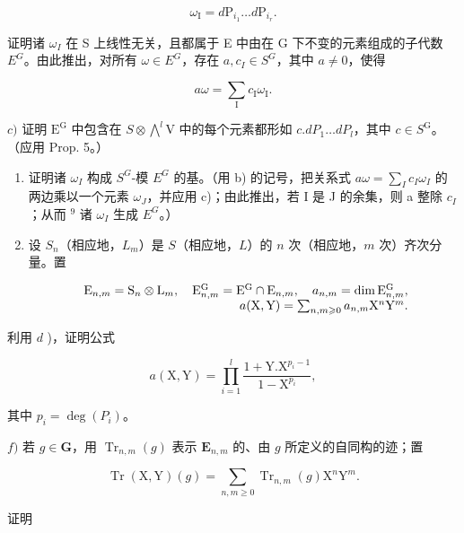 \[
\omega_ {\mathrm{I}} = d \mathrm{P} _ {i _ {1}} \dots d \mathrm{P} _ {i _ {r}}.
\]

证明诸 \(\omega_{I}\) 在 S 上线性无关，且都属于 E 中由在 G 下不变的元素组成的子代数 \(E^{G}\)。由此推出，对所有 \(\omega \in E^{G}\)，存在 \(a, c_{I} \in S^{G}\)，其中 \(a \neq 0\)，使得

\[
a \omega = \sum_ {\mathrm{I}} c _ {\mathrm{I}} \omega_ {\mathrm{I}}.
\]

\(c)\) 证明 \(\mathrm{E}^{\mathrm{G}}\) 中包含在 \(S\otimes \bigwedge^{l}\mathrm{V}\) 中的每个元素都形如 \(c.dP_{1}\ldots dP_{l}\)，其中 \(c\in S^{\mathrm{G}}\)。（应用 Prop. 5。）

\begin{enumerate}
\def\labelenumi{\alph{enumi})}
\setcounter{enumi}{3}
\item
  证明诸 \(\omega_{I}\) 构成 \(S^{G}\)-模 \(E^{G}\) 的基。（用 b) 的记号，把关系式 \(a\omega = \sum_{I} c_{I}\omega_{I}\) 的两边乘以一个元素 \(\omega_{J}\)，并应用 c)；由此推出，若 I 是 J 的余集，则 a 整除 \(c_{I}\)；从而 \(^{9}\) 诸 \(\omega_{I}\) 生成 \(E^{G}\)。）
\item
  设 \(S_{n}\)（相应地，\(L_{m}\)）是 \(S\)（相应地，\(L\)）的 \(n\) 次（相应地，\(m\) 次）齐次分量。置
\end{enumerate}

\[
\begin{array}{r l r} & & {\mathrm{E} _ {n, m} = \mathrm{S} _ {n} \otimes \mathrm{L} _ {m}, \quad \mathrm{E} _ {n, m} ^ {\mathrm{G}} = \mathrm{E} ^ {\mathrm{G}} \cap \mathrm{E} _ {n, m}, \quad a _ {n, m} = \dim \mathrm{E} _ {n, m} ^ {\mathrm{G}},} \\ & & {a (\mathrm{X}, \mathrm{Y}) = \sum_ {n, m \geqslant 0} a _ {n, m} \mathrm{X} ^ {n} \mathrm{Y} ^ {m}.} \end{array}
\]

利用 \(d\) )，证明公式

\[
a (\mathrm{X}, \mathrm{Y}) = \prod_ {i = 1} ^ {l} \frac {1 + \mathrm{Y} . \mathrm{X} ^ {p _ {i} - 1}}{1 - \mathrm{X} ^ {p _ {i}}},
\]

其中 \(p_{i} = \deg(P_{i})\)。

\(f)\) 若 \(g \in \mathbf{G}\)，用 \(\operatorname{Tr}_{n,m}(g)\) 表示 \(\mathbf{E}_{n,m}\) 的、由 \(g\) 所定义的自同构的迹；置

\[
\operatorname{Tr} (\mathrm{X}, \mathrm{Y}) (g) = \sum_ {n, m \geqslant 0} \operatorname{Tr} _ {n, m} (g) \mathrm{X} ^ {n} \mathrm{Y} ^ {m}.
\]

证明

